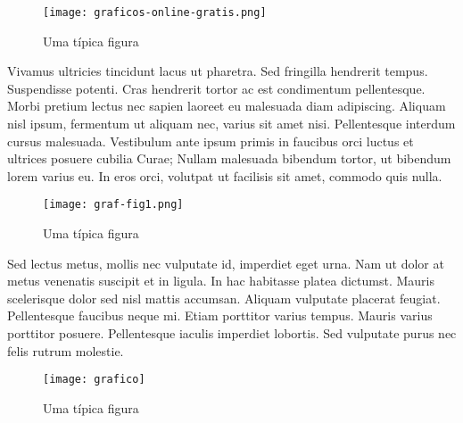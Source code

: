 \begin{figure}[!htp]
\centering
\texttt{[image: graficos-online-gratis.png]}
\caption{Uma t\'{i}pica figura}
\end{figure}


Vivamus ultricies tincidunt lacus ut pharetra. Sed fringilla hendrerit tempus. Suspendisse potenti. Cras hendrerit tortor ac est condimentum pellentesque. Morbi pretium lectus nec sapien laoreet eu malesuada diam adipiscing. Aliquam nisl ipsum, fermentum ut aliquam nec, varius sit amet nisi. Pellentesque interdum cursus malesuada. Vestibulum ante ipsum primis in faucibus orci luctus et ultrices posuere cubilia Curae; Nullam malesuada bibendum tortor, ut bibendum lorem varius eu. In eros orci, volutpat ut facilisis sit amet, commodo quis nulla.


\begin{figure}[!htp]
\centering
\texttt{[image: graf-fig1.png]}
\caption{Uma t\'{i}pica figura}
\end{figure}



Sed lectus metus, mollis nec vulputate id, imperdiet eget urna. Nam ut dolor at metus venenatis suscipit et in ligula. In hac habitasse platea dictumst. Mauris scelerisque dolor sed nisl mattis accumsan. Aliquam vulputate placerat feugiat. Pellentesque faucibus neque mi. Etiam porttitor varius tempus. Mauris varius porttitor posuere. Pellentesque iaculis imperdiet lobortis. Sed vulputate purus nec felis rutrum molestie. 


\begin{figure}[!htp]
\centering
\texttt{[image: grafico]}
\caption{Uma t\'{i}pica figura}
\end{figure}


